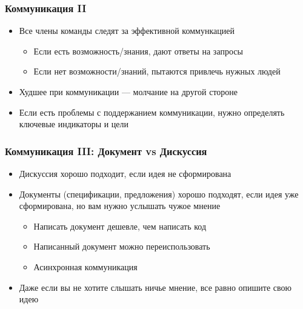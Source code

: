 \documentclass[10pt,pdf,utf8,aspectratio=169,xcolor=dvipsnames,x11names,center]{beamer}
\begin{document}
\begin{frame}
  \frametitle{Коммуникация II}

  \begin{itemize}
  \item Все члены команды следят за эффективной коммункацией
    \begin{itemize}[<.(1)->]
    \item Если есть возможность/знания, дают ответы на запросы
    \item Если нет возможности/знаний, пытаются привлечь нужных людей
    \end{itemize}
  \item Худшее при коммуникации --- молчание на другой стороне
  \item Если есть проблемы с поддержанием коммуникации, нужно определять ключевые индикаторы и цели
  \end{itemize}

\end{frame}

\begin{frame}
  \frametitle{Коммуникация III: Документ vs Дискуссия}

  \begin{itemize}
  \item Дискуссия хорошо подходит, если идея не сформирована
  \item Документы (спецификации, предложения) хорошо подходят, если идея уже сформирована, но вам нужно услышать чужое мнение
    \begin{itemize}[<.(1)->]
    \item Написать документ дешевле, чем написать код
    \item Написанный документ можно переиспользовать
    \item Асинхронная коммуникация
    \end{itemize}
  \item Даже если вы не хотите слышать ничье мнение, все равно опишите свою идею
  \end{itemize}
  
\end{frame}
\end{document}
